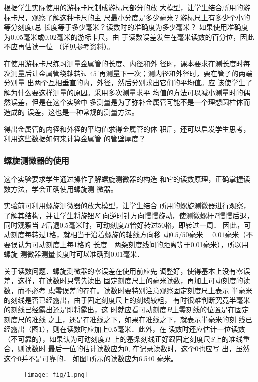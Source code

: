根据学生实际使用的游标卡尺制成游标尺部分的放
大模型，让学生结合所用的游标卡尺，观察了解这种卡尺的主
尺最小分度是多少毫米？游标尺上有多少个小的等分刻度t总
长度等于多少毫米？读数时的准确度为多少毫米？
如果使用准确度为0.05毫米或0.02毫米的游标卡尺，由
于读数误差发生在毫米读数的百分位，因此不应再估读一位
（详见参考资料）。

在使用游标卡尺练习测量金属管的长度、内径和外
径时，课本要求在测长度时每次测量后让金属管绕轴转过
$45^{\circ}$再测量下一次；测内径和外径时，要在管子的两端分别量
出两个互相垂直的内，外径，然后分别求出它们的平均值。应
该使学生了解为什么要这样测量的原因。采用多次测量求平
均值的方法可以减小测量时的偶然误差，但是在这个实验中
多测量是为了弥补金属管可能不是一个理想圆柱体而造成的
误差，这也是一种常规的测量方法。

得出金属管的内径和外径的平均值求得金属管的体
积后，还可以启发学生思考，利用这些数据如何来计算金属管
的管壁厚度？

\subsubsection{螺旋测微器的使用}
这个实验要求学生通过操作了解螺旋测微器的构造
和它的读数原理，正确掌握读数方法，学会正确使用螺旋测
微器。

实验前可利用螺旋测微器的放大模型，让学生结合
所用的螺旋测微器进行观察，了解其结构，并让学生将旋钮$K$
向逆时针方向慢慢旋动，使测微螺杆$P$慢慢后退，同时观察当
$P$后退0.5毫米时，可动刻度$H$恰好转过50格，即转过一周．
因此，可动刻度每转过1格，就相当于沿着螺旋的轴线方向移
动$0.5/50$毫米$=0.01$毫米（不要误认为可动刻度上每1格的
长度－两条刻度线间的距离等于0.01毫米），所以用螺旋
测微器测量长度时可以准确到0.01毫米．

关于读数问题．螺旋测微器的零误差在使用前应先
调整好，使得基本上没有零误差，这样，在读数时只需先读出
固定刻度尺上的毫米读数，再加上可动刻度的读数，而不必考
虑零误差的存在。读数时要特别注意观察固定刻度尺上表示
半毫米的刻线是否已经露出，由于固定刻度尺上的刻线较粗，
有时很难判断究竟半毫米的刻线已经露出还是即将露出，这
时就应看可动刻度$H$上零刻线的位置是在固定刻度尺的准线
之上，还是在准线之下，如果在准线之下，就表示半毫米的刻
线已经露出（图1），则在读数时应加上0.5毫米．此外，在
读数时还应估计一位读数（不可靠的），如果认为可动刻度$H$
上的基条刻线正好跟固定刻度尺$S$上的准线重合，则读数时
最后一位的估计读数应为0, 在记录读数时，这个0也应写
出，虽然这个0并不是可靠的．
如图1所示的读数应为6.540
毫米。

\begin{figure}[htp]
    \centering
\texttt{[image: fig/1.png]}
    \caption{}
\end{figure}


